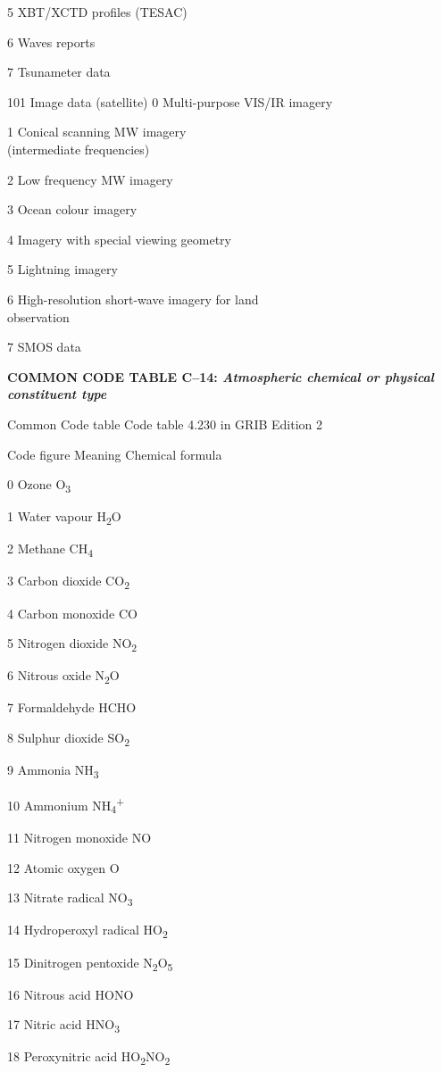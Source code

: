 5 XBT/XCTD profiles (TESAC)

6 Waves reports

7 Tsunameter data

101 Image data (satellite) 0 Multi-purpose VIS/IR imagery

1 Conical scanning MW imagery\\
(intermediate frequencies)

2 Low frequency MW imagery

3 Ocean colour imagery

4 Imagery with special viewing geometry

5 Lightning imagery

6 High-resolution short-wave imagery for land\\
observation

7 SMOS data

\textbf{COMMON CODE TABLE C--14: \emph{Atmospheric chemical or physical constituent type}}

Common Code table Code table 4.230 in GRIB Edition 2

Code figure Meaning Chemical formula

0 Ozone O\textsubscript{3}

1 Water vapour H\textsubscript{2}O

2 Methane CH\textsubscript{4}

3 Carbon dioxide CO\textsubscript{2}

4 Carbon monoxide CO

5 Nitrogen dioxide NO\textsubscript{2}

6 Nitrous oxide N\textsubscript{2}O

7 Formaldehyde HCHO

8 Sulphur dioxide SO\textsubscript{2}

9 Ammonia NH\textsubscript{3}

10 Ammonium NH\textsubscript{4}\textsuperscript{+}

11 Nitrogen monoxide NO

12 Atomic oxygen O

13 Nitrate radical NO\textsubscript{3}

14 Hydroperoxyl radical HO\textsubscript{2}

15 Dinitrogen pentoxide N\textsubscript{2}O\textsubscript{5}

16 Nitrous acid HONO

17 Nitric acid HNO\textsubscript{3}

18 Peroxynitric acid HO\textsubscript{2}NO\textsubscript{2}

